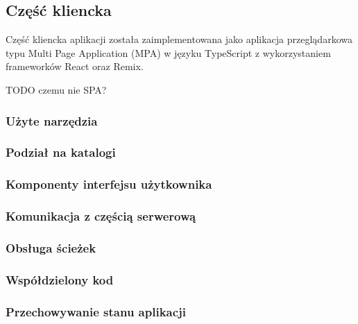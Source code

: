 \subsection{Część kliencka}

Część kliencka aplikacji została zaimplementowana jako aplikacja przeglądarkowa typu Multi Page Application (MPA) w języku TypeScript z wykorzystaniem frameworków React oraz Remix.

TODO czemu nie SPA?

\subsubsection{Użyte narzędzia}

\subsubsection{Podział na katalogi}

\subsubsection{Komponenty interfejsu użytkownika}

\subsubsection{Komunikacja z częścią serwerową}

\subsubsection{Obsługa ścieżek}

\subsubsection{Współdzielony kod}

\subsubsection{Przechowywanie stanu aplikacji}